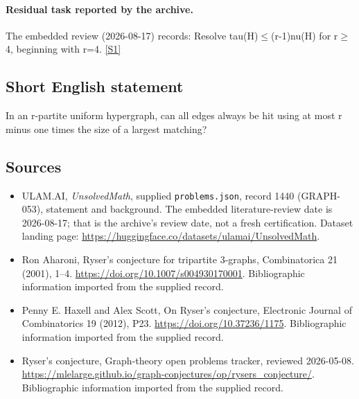 \documentclass[11pt,a4paper]{article}
\newcommand{\sref}[2]{\hyperlink{source:#1:#2}{[S#2]}}
\begin{document}
\paragraph{Residual task reported by the archive.}

The embedded review (2026-08-17) records: Resolve tau(H)\ensuremath{≤}(r-1)nu(H) for r\ensuremath{≥}4, beginning with r=4. \sref{1440}{1}

\subsection{Short English statement}

In an r-partite uniform hypergraph, can all edges always be hit using at most r minus one times the size of a largest matching?

\subsection{Sources}

{\small

\begin{itemize}

\item[\hypertarget{source:1440:1}{S1}] ULAM.AI, \emph{UnsolvedMath}, supplied \texttt{problems.json}, record 1440 (GRAPH-053), statement and background. The embedded literature-review date is 2026-08-17; that is the archive’s review date, not a fresh certification. Dataset landing page: \url{https://huggingface.co/datasets/ulamai/UnsolvedMath}.

\item[\hypertarget{source:1440:2}{S2}] Ron Aharoni, Ryser's conjecture for tripartite 3-graphs, Combinatorica 21 (2001), 1–4. \url{https://doi.org/10.1007/s004930170001}. Bibliographic information imported from the supplied record.

\item[\hypertarget{source:1440:3}{S3}] Penny E. Haxell and Alex Scott, On Ryser's conjecture, Electronic Journal of Combinatorics 19 (2012), P23. \url{https://doi.org/10.37236/1175}. Bibliographic information imported from the supplied record.

\item[\hypertarget{source:1440:4}{S4}] Ryser's conjecture, Graph-theory open problems tracker, reviewed 2026-05-08. \url{https://mlelarge.github.io/graph-conjectures/op/rysers_conjecture/}. Bibliographic information imported from the supplied record.

\end{itemize}

}

\label{end:1440}
\end{document}
